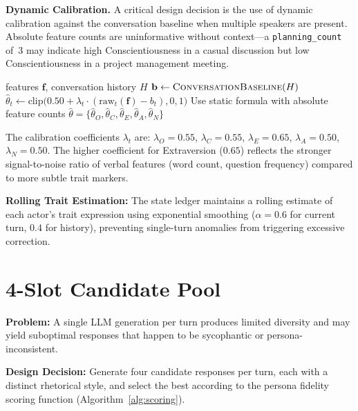 \textbf{Dynamic Calibration.} A critical design decision is the use of dynamic calibration against the conversation baseline when multiple speakers are present. Absolute feature counts are uninformative without context---a \texttt{planning\_count} of~3 may indicate high Conscientiousness in a casual discussion but low Conscientiousness in a project management meeting.

\begin{algorithm}[t]
\caption{OCEAN Estimation with Dynamic Calibration}
\label{alg:ocean}
\begin{algorithmic}[1]
\Require features $\mathbf{f}$, conversation history $H$
    \State $\mathbf{b} \gets \textsc{ConversationBaseline}(H)$
        \State $\hat{\theta}_t \gets \text{clip}\big(0.50 + \lambda_t \cdot (\text{raw}_t(\mathbf{f}) - b_t), 0, 1\big)$
    \EndFor
\Else
    \State Use static formula with absolute feature counts
\EndIf
\State \Return $\hat{\theta} = \{\hat{\theta}_O, \hat{\theta}_C, \hat{\theta}_E, \hat{\theta}_A, \hat{\theta}_N\}$
\end{algorithmic}
\end{algorithm}

The calibration coefficients $\lambda_t$ are: $\lambda_O = 0.55$, $\lambda_C = 0.55$, $\lambda_E = 0.65$, $\lambda_A = 0.50$, $\lambda_N = 0.50$. The higher coefficient for Extraversion ($0.65$) reflects the stronger signal-to-noise ratio of verbal features (word count, question frequency) compared to more subtle trait markers.

\textbf{Rolling Trait Estimation:} The state ledger maintains a rolling estimate of each actor's trait expression using exponential smoothing ($\alpha = 0.6$ for current turn, $0.4$ for history), preventing single-turn anomalies from triggering excessive correction.


\section{4-Slot Candidate Pool}

\textbf{Problem:} A single LLM generation per turn produces limited diversity and may yield suboptimal responses that happen to be sycophantic or persona-inconsistent.

\textbf{Design Decision:} Generate four candidate responses per turn, each with a distinct rhetorical style, and select the best according to the persona fidelity scoring function (Algorithm~\ref{alg:scoring}).

